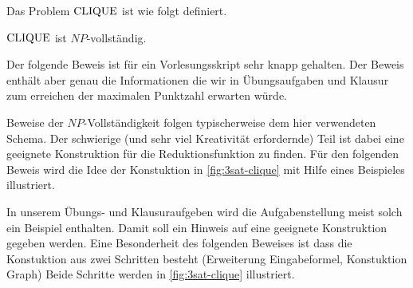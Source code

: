 \begin{Def}[$\CLIQUE$]
    Das Problem $\CLIQUE$ ist wie folgt definiert.
    \begin{center}
    \end{center}
\end{Def}
\begin{Satz}[name={[$\CLIQUE$ ist $NP$-vollständig]}]
	$\CLIQUE$ ist $NP$-vollständig.
\end{Satz}
\begin{Bemerkung}
 Der folgende Beweis ist für ein Vorlesungsskript sehr knapp gehalten.
 Der Beweis enthält aber genau die Informationen die wir in Übungsaufgaben und Klausur zum erreichen der maximalen Punktzahl erwarten würde.
 
 Beweise der $NP$-Vollständigkeit folgen typischerweise dem hier verwendeten Schema.
 Der schwierige (und sehr viel Kreativität erfordernde) Teil ist dabei eine geeignete Konstruktion für die Reduktionsfunktion zu finden.
 Für den folgenden Beweis wird die Idee der Konstuktion in \autoref{fig:3sat-clique} mit Hilfe eines Beispieles illustriert.
 
 In unserem Übungs- und Klausuraufgeben wird die Aufgabenstellung meist solch ein Beispiel enthalten.
 Damit soll ein Hinweis auf eine geeignete Konstruktion gegeben werden.
 Eine Besonderheit des folgenden Beweises ist dass die Konstuktion aus zwei Schritten besteht (Erweiterung Eingabeformel, Konstuktion Graph) Beide Schritte werden in \autoref{fig:3sat-clique} illustriert.
\end{Bemerkung}

